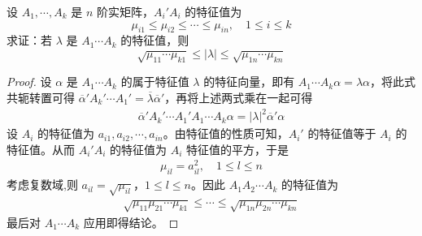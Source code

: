 \documentclass[../../main.tex]{subfiles}%
\begin{document}
\begin{example}\label{example:例9.56}
设 \(A_1,\cdots,A_k\) 是 \(n\) 阶实矩阵，\(A_i'A_i\) 的特征值为
\[
\mu_{i1} \leqslant  \mu_{i2} \leqslant  \cdots \leqslant  \mu_{in},\quad 1\leqslant  i \leqslant  k
\]
求证：若 \(\lambda\) 是 \(A_1\cdots A_k\) 的特征值，则
\[
\sqrt{\mu_{11}\cdots\mu_{k1}} \leqslant  |\lambda| \leqslant  \sqrt{\mu_{1n}\cdots\mu_{kn}}
\]
\end{example}
\begin{proof}

设 \(\alpha\) 是 \(A_1\cdots A_k\) 的属于特征值 \(\lambda\) 的特征向量，即有 \(A_1\cdots A_k\alpha = \lambda\alpha\)，将此式共轭转置可得 \(\overline{\alpha}'A_k'\cdots A_1' = \overline{\lambda}\overline{\alpha}'\)，再将上述两式乘在一起可得
\begin{align*}
\overline{\alpha}'A_k'\cdots A_1'A_1\cdots A_k\alpha = |\lambda|^2\overline{\alpha}'\alpha
\end{align*}
设 \(A_i\) 的特征值为 \(a_{i1},a_{i2},\cdots,a_{in}\)。由特征值的性质可知，\(A_i'\) 的特征值等于 \(A_i\) 的特征值。从而 \(A_i'A_i\) 的特征值为 \(A_i\) 特征值的平方，于是
\begin{align*}
\mu_{il} = a_{il}^2,\quad 1\leqslant  l \leqslant  n
\end{align*}
考虑复数域,则 \(a_{il} = \sqrt{\mu_{il}}\)，\(1\leqslant  l \leqslant  n\)。因此 \(A_1A_2\cdots A_k\) 的特征值为
\begin{align*}
\sqrt{\mu_{11}\mu_{21}\cdots\mu_{k1}} \leqslant  \cdots \leqslant  \sqrt{\mu_{1n}\mu_{2n}\cdots\mu_{kn}}
\end{align*}
最后对 \(A_1\cdots A_k\) 应用即得结论。 

\end{proof}
\end{document}
